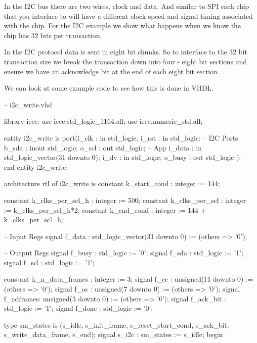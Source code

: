 In the \ac{I2C} bus there are two wires, clock and data. And similar to \ac{SPI} each chip that you interface to will have a different clock speed and signal timing associated with the chip. For the \ac{I2C} example we show what happens when we know the chip has $32$ bits per transaction. 	
	
In the \ac{I2C} protocol data is sent in eight bit chunks. So to interface to the $32$ bit transaction size we break the transaction down into four - eight bit sections and ensure we have an acknowledge bit at the end of each eight bit section. 
	
We can look at some example code to see how this is done in \ac{VHDL}.	

\begin{VHDLlisting}[tabsize=4]
-- i2c_write.vhd

library ieee;
    use ieee.std_logic_1164.all;
    use ieee.numeric_std.all;


entity i2c_write is
    port(i_clk        : in    std_logic;
         i_rst        : in    std_logic;
         -- I2C Ports 
         b_sda        : inout std_logic;
         o_scl        :   out std_logic;
         -- App 
         i_data       : in    std_logic_vector(31 downto 0);
         i_dv         : in    std_logic;
         o_busy       :   out std_logic
    );
end entity i2c_write;

architecture rtl of i2c_write is 
    constant k_start_cond     : integer := 144;
	
    constant k_clks_per_scl_h : integer := 500;
    constant k_clks_per_scl   : integer := k_clks_per_scl_h*2;
	constant k_end_cond       : integer := 144 + k_clks_per_scl_h;
	
    -- Input Regs
    signal f_data    : std_logic_vector(31 downto 0) := (others => '0');
    	
    -- Output Regs
    signal f_busy    : std_logic := '0';
    signal f_sda     : std_logic := '1';
    signal f_scl     : std_logic := '1';

	constant k_n_data_frames : integer := 3;
    signal f_cc      : unsigned(11 downto 0) := (others => '0');
    signal f_os      : unsigned(7 downto 0) := (others => '0');
	signal f_ndframes: unsigned(3 downto 0) := (others => '0');
    signal f_ack_bit : std_logic := '1';
	signal f_done    : std_logic := '0';

    type sm_states is (s_idle, s_init_frame, s_reset_start_cond, s_ack_bit, s_write_data_frame, s_end);
    signal s_i2c  : sm_states := s_idle;
begin


\end{VHDLlisting}

